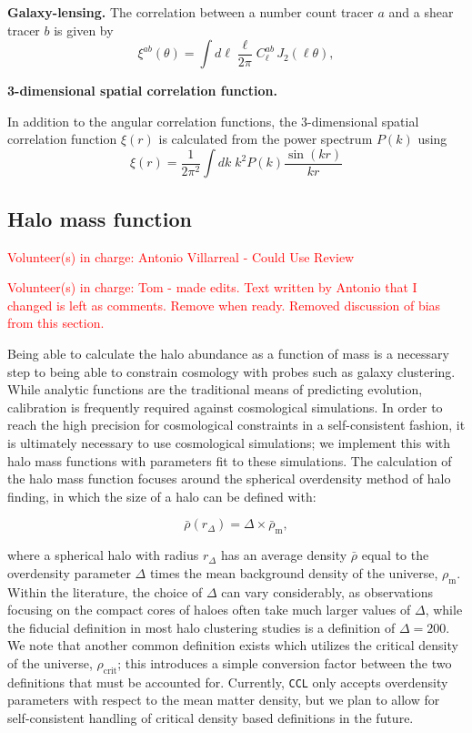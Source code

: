 \documentclass[\docopts]{\docclass}
\newcommand{\vol}[1]{\textcolor{red}{Volunteer(s) in charge: #1}}
\newcommand{\ccl}{{\tt CCL}\xspace}
\begin{document}
{\bf Galaxy-lensing.} The correlation between a number count tracer $a$ and a shear tracer $b$ is given by
\begin{equation}
  \xi^{ab}(\theta) = \int d\ell \frac{\ell}{2\pi} C^{ab}_\ell\, J_2(\ell\theta),
\end{equation}

{\bf 3-dimensional spatial correlation function.}

In addition to the angular correlation functions, the 3-dimensional spatial correlation function $\xi(r)$ is 
calculated from the power spectrum $P(k)$ using
\begin{equation}
\xi(r) = \frac{1}{2 \pi^2} \int dk \; k^2 P(k) \frac{\sin(kr)}{kr}
\end{equation}

\subsection{Halo mass function}
\vol{Antonio Villarreal - Could Use Review}

\vol{Tom - made edits. Text written by Antonio that I changed is left as comments. Remove when ready. Removed discussion of bias from this section.}

Being able to calculate the halo abundance as a function of mass is a necessary step to being able to constrain cosmology with probes such as galaxy clustering. While analytic functions are the traditional means of predicting evolution, calibration is frequently required against cosmological simulations. In order to reach the high precision for cosmological constraints in a self-consistent fashion, it is ultimately necessary to use cosmological simulations; we implement this with halo mass functions with parameters fit to these simulations. The calculation of the halo mass function focuses around the spherical overdensity method of halo finding, in which the size of a halo can be defined with:

\begin{equation}
\bar{\rho}(r_{\Delta}) = \Delta \times \bar{\rho}_{\mathrm{m}},
\end{equation}

where a spherical halo with radius $r_{\Delta}$ has an average density $\bar{\rho}$ equal to the overdensity parameter $\Delta$ times the mean background density of the universe, $\rho_{\mathrm{m}}$. Within the literature, the choice of $\Delta$ can vary considerably, as observations focusing on the compact cores of haloes often take much larger values of $\Delta$, while the fiducial definition in most halo clustering studies is a definition of $\Delta = 200$. We note that another common definition exists which utilizes the critical density of the universe, $\rho_{\mathrm{crit}}$; this introduces a simple conversion factor between the two definitions that must be accounted for. Currently, \ccl only accepts overdensity parameters with respect to the mean matter density, but we plan to allow for self-consistent handling of critical density based definitions in the future.
\end{document}
